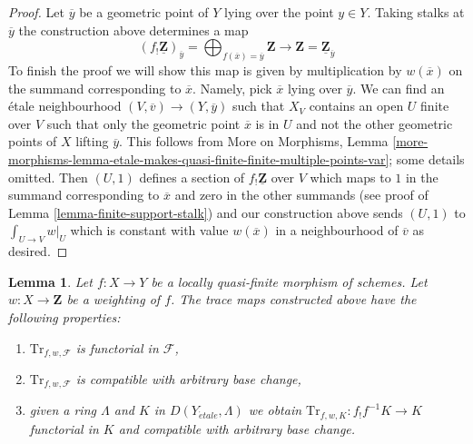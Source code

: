 \documentclass{stacks-project}
\theoremstyle{plain}
\newtheorem{lemma}[subsection]{Lemma}
\theoremstyle{definition}
\theoremstyle{remark}
\numberwithin{equation}{subsection}
\def\etale{{\acute{e}tale}}
\begin{document}
\begin{proof}
\medskip\noindent
Let $\overline{y}$ be a geometric point of $Y$ lying over the point $y \in Y$.
Taking stalks at $\overline{y}$ the construction above determines a map
$$
(f_!\underline{\mathbf{Z}})_{\overline{y}}
= \bigoplus\nolimits_{f(\overline{x}) = \overline{y}} \mathbf{Z}
\longrightarrow
\mathbf{Z} = \underline{\mathbf{Z}}_{\overline{y}}
$$
To finish the proof we will show this map is given by multiplication by
$w(\overline{x})$ on the summand corresponding to $\overline{x}$.
Namely, pick $\overline{x}$ lying over $\overline{y}$.
We can find an \'etale neighbourhood $(V, \overline{v}) \to (Y, \overline{y})$
such that $X_V$ contains an open $U$ finite over $V$
such that only the geometric point $\overline{x}$ is in $U$
and not the other geometric points of $X$ lifting $\overline{y}$.
This follows from More on Morphisms, Lemma
\ref{more-morphisms-lemma-etale-makes-quasi-finite-finite-multiple-points-var};
some details omitted. Then $(U, 1)$ defines a section of
$f_!\underline{\mathbf{Z}}$ over $V$ which maps to $1$ in the summand
corresponding to $\overline{x}$ and zero in the other summands
(see proof of Lemma \ref{lemma-finite-support-stalk}) and
our construction above sends $(U, 1)$ to $\int_{U \to V} w|_U$
which is constant with value $w(\overline{x})$ in a neighbourhood
of $\overline{v}$ as desired.
\end{proof}

\begin{lemma}
\label{lemma-properties-trace-map}
Let $f : X \to Y$ be a locally quasi-finite morphism of schemes.
Let $w : X \to \mathbf{Z}$ be a weighting of $f$. The trace maps
constructed above have the following properties:
\begin{enumerate}
\item $\text{Tr}_{f, w, \mathcal{F}}$ is functorial in $\mathcal{F}$,
\item $\text{Tr}_{f, w, \mathcal{F}}$ is compatible with arbitrary base change,
\item given a ring $\Lambda$ and $K$ in $D(Y_\etale, \Lambda)$
we obtain $\text{Tr}_{f, w, K} : f_!f^{-1}K \to K$ functorial in $K$
and compatible with arbitrary base change.
\end{enumerate}
\end{lemma}
\end{document}
